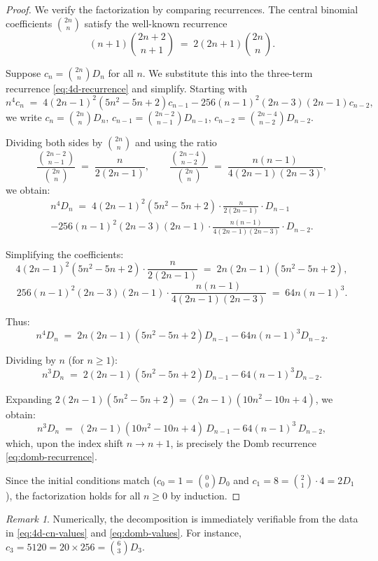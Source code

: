 \documentclass[12pt,a4paper]{article}
\numberwithin{equation}{section}
\theoremstyle{plain}
\theoremstyle{definition}
\theoremstyle{remark}
\newtheorem{remark}[theorem]{Remark}
\begin{document}
\begin{proof}
We verify the factorization by comparing recurrences. The central binomial coefficients $\binom{2n}{n}$
satisfy the well-known recurrence
\begin{equation}\label{eq:catalan-recurrence}
  (n+1) \binom{2n+2}{n+1} \;=\; 2(2n+1) \binom{2n}{n}.
\end{equation}

Suppose $c_n = \binom{2n}{n} D_n$ for all $n$. We substitute this into the three-term recurrence
\eqref{eq:4d-recurrence} and simplify. Starting with
\[
  n^4 c_n \;=\; 4(2n-1)^2(5n^2 - 5n + 2) c_{n-1} - 256(n-1)^2(2n-3)(2n-1) c_{n-2},
\]
we write $c_n = \binom{2n}{n} D_n$, $c_{n-1} = \binom{2n-2}{n-1} D_{n-1}$, $c_{n-2} = \binom{2n-4}{n-2} D_{n-2}$.

Dividing both sides by $\binom{2n}{n}$ and using the ratio
\[
  \frac{\binom{2n-2}{n-1}}{\binom{2n}{n}} \;=\; \frac{n}{2(2n-1)}, \qquad
  \frac{\binom{2n-4}{n-2}}{\binom{2n}{n}} \;=\; \frac{n(n-1)}{4(2n-1)(2n-3)},
\]
we obtain:
\begin{multline}\label{eq:domb-proof-step}
  n^4 D_n \;=\; 4(2n-1)^2(5n^2 - 5n + 2) \cdot \frac{n}{2(2n-1)} \cdot D_{n-1} \\
  - 256(n-1)^2(2n-3)(2n-1) \cdot \frac{n(n-1)}{4(2n-1)(2n-3)} \cdot D_{n-2}.
\end{multline}

Simplifying the coefficients:
\[
  4(2n-1)^2(5n^2 - 5n + 2) \cdot \frac{n}{2(2n-1)} \;=\; 2n(2n-1)(5n^2 - 5n + 2),
\]
\[
  256(n-1)^2(2n-3)(2n-1) \cdot \frac{n(n-1)}{4(2n-1)(2n-3)} \;=\; 64 n(n-1)^3.
\]

Thus:
\[
  n^4 D_n \;=\; 2n(2n-1)(5n^2 - 5n + 2) D_{n-1} - 64 n(n-1)^3 D_{n-2}.
\]

Dividing by $n$ (for $n \geq 1$):
\[
  n^3 D_n \;=\; 2(2n-1)(5n^2 - 5n + 2) D_{n-1} - 64(n-1)^3 D_{n-2}.
\]

Expanding $2(2n-1)(5n^2 - 5n + 2) = (2n-1)(10n^2 - 10n + 4)$, we obtain:
\[
  n^3 D_n \;=\; (2n-1)(10n^2 - 10n + 4)\, D_{n-1} - 64(n-1)^3\, D_{n-2},
\]
which, upon the index shift $n \to n+1$, is precisely the Domb recurrence \eqref{eq:domb-recurrence}.

Since the initial conditions match ($c_0 = 1 = \binom{0}{0} D_0$ and $c_1 = 8 = \binom{2}{1} \cdot 4 = 2 D_1$),
the factorization holds for all $n \geq 0$ by induction.
\end{proof}

\begin{remark}
Numerically, the decomposition is immediately verifiable from the data in \eqref{eq:4d-cn-values}
and \eqref{eq:domb-values}. For instance, $c_3 = 5120 = 20 \times 256 = \binom{6}{3} D_3$.
\end{remark}
\end{document}
